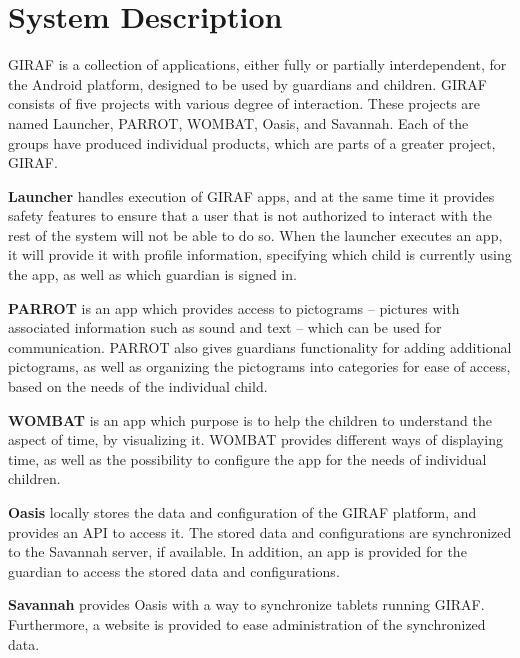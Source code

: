\section{System Description}
\label{common:sec:sys_description}
GIRAF is a collection of applications, either fully or partially interdependent, for the Android platform, designed to be used by guardians and children. GIRAF consists of five projects with various degree of interaction. These projects are named Launcher, PARROT, WOMBAT, Oasis, and Savannah. Each of the groups have produced individual products, which are parts of a greater project, GIRAF. 

\textbf{Launcher} handles execution of GIRAF apps, and at the same time it provides safety features to ensure that a user that is not authorized to interact with the rest of the system will not be able to do so. When the launcher executes an app, it will provide it with profile information, specifying which child is currently using the app, as well as which guardian is signed in.

\textbf{PARROT} is an app which provides access to pictograms -- pictures with associated information such as sound and text -- which can be used for communication. PARROT also gives guardians functionality for adding additional pictograms, as well as organizing the pictograms into categories for ease of access, based on the needs of the individual child.

\textbf{WOMBAT} is an app which purpose is to help the children to understand the aspect of time, by visualizing it. WOMBAT provides different ways of displaying time, as well as the possibility to configure the app for the needs of individual children. 

\textbf{Oasis} locally stores the data and configuration of the GIRAF platform, and provides an API to access it. The stored data and configurations are synchronized to the Savannah server, if available. In addition, an app is provided for the guardian to access the stored data and configurations.

\textbf{Savannah} provides Oasis with a way to synchronize tablets running GIRAF. Furthermore, a website is provided to ease administration of the synchronized data.